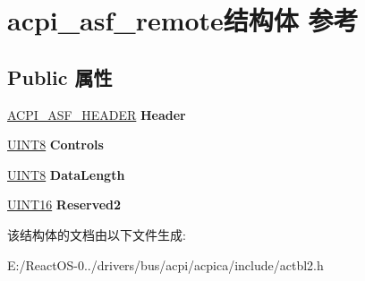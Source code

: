 \hypertarget{structacpi__asf__remote}{}\section{acpi\+\_\+asf\+\_\+remote结构体 参考}
\label{structacpi__asf__remote}
\subsection*{Public 属性}
\begin{DoxyCompactItemize}
\item 
\mbox{\label{structacpi__asf__remote_a2a29938d767409745afdb038f4bc61a8}} 
\hyperlink{structacpi__asf__header}{A\+C\+P\+I\+\_\+\+A\+S\+F\+\_\+\+H\+E\+A\+D\+ER} {\bfseries Header}
\item 
\mbox{\label{structacpi__asf__remote_aa3f4bbed723fbd561b8cf2f40b8f699f}} 
\hyperlink{_processor_bind_8h_ab27e9918b538ce9d8ca692479b375b6a}{U\+I\+N\+T8} {\bfseries Controls}
\item 
\mbox{\label{structacpi__asf__remote_a81d4b46ba81bc148eddb8427a4aec57e}} 
\hyperlink{_processor_bind_8h_ab27e9918b538ce9d8ca692479b375b6a}{U\+I\+N\+T8} {\bfseries Data\+Length}
\item 
\mbox{\label{structacpi__asf__remote_a83caa9734e53896f85c57b283aa9ece8}} 
\hyperlink{_processor_bind_8h_a09f1a1fb2293e33483cc8d44aefb1eb1}{U\+I\+N\+T16} {\bfseries Reserved2}
\end{DoxyCompactItemize}


该结构体的文档由以下文件生成\+:\begin{DoxyCompactItemize}
\item 
E\+:/\+React\+O\+S-\/0../drivers/bus/acpi/acpica/include/actbl2.\+h\end{DoxyCompactItemize}
